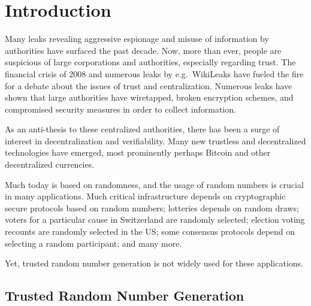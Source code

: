 \section{Introduction}\label{cha:introduction}

Many leaks revealing aggressive espionage and misuse of information by authorities have surfaced the past decade.
Now, more than ever, people are suspicious of large corporations and authorities, especially regarding trust.
The financial crisis of 2008 and numerous leaks by e.g.\ WikiLeaks have fueled the fire for a debate about the issues of trust and centralization.
Numerous leaks have shown that large authorities have wiretapped, broken encryption schemes, and compromised security measures in order to collect information.

As an anti-thesis to these centralized authorities, there has been a surge of interest in decentralization and verifiability.
Many new trustless and decentralized technologies have emerged, most prominently perhaps Bitcoin and other decentralized currencies.

Much today is based on randomness, and the usage of random numbers is crucial in many applications.
Much critical infrastructure depends on cryptographic secure protocols based on random numbers;
lotteries  depends on random draws; voters for a particular cause in Switzerland are randomly selected; election voting recounts are randomly selected in the US\@; some consensus protocols depend on selecting a random participant; and many more.

Yet, trusted random number generation is not widely used for these applications.

\subsection{Trusted Random Number Generation} %



